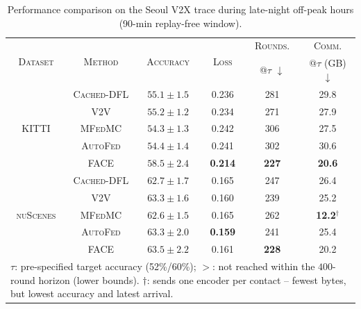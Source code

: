 \begin{table}[t]
    \centering
\caption{Performance comparison on the Seoul V2X trace during late-night off-peak hours (90-min replay-free window).}
    \label{tab:seoul_night}
    \footnotesize
    \renewcommand{\arraystretch}{1.0}
    \setlength{\tabcolsep}{3pt}
    \begin{tabular}{c|c|c|c|c|c}
        \toprule
        \multirow{2}{*}{\textsc{Dataset}}
        & \multirow{2}{*}{\textsc{Method}}
        & \multirow{2}{*}{\textsc{Accuracy}}
        & \multirow{2}{*}{\textsc{Loss}}
        & \textsc{Rounds.}
        & \textsc{Comm.} \\

        &
        &
        &
        & @$\tau$ $\downarrow$
        & @$\tau$ (GB) $\downarrow$ \\
        \midrule

        \multirow{5}{*}{\textsc{KITTI}}
        & \textsc{Cached-DFL}
        & $55.1 \pm 1.5$
        & 0.236
        & 281
        & 29.8 \\

        & \textsc{V2V}
        & $55.2 \pm 1.2$
        & 0.234
        & 271
        & 27.9 \\[1pt]

        & \textsc{MFedMC}
        & $54.3 \pm 1.3$
        & 0.242
        & 306
        & 27.5 \\

        & \textsc{AutoFed}
        & $54.4 \pm 1.4$
        & 0.241
        & 302
        & 30.6 \\[1pt]

        & \textsc{FACE}
        & $\mathbf{58.5 \pm 2.4}$
        & \textbf{0.214}
        & \textbf{227}
        & \textbf{20.6} \\

        \midrule

        \multirow{5}{*}{\textsc{nuScenes}}
        & \textsc{Cached-DFL}
        & $62.7 \pm 1.7$
        & 0.165
        & 247
        & 26.4 \\

        & \textsc{V2V}
        & $63.3 \pm 1.6$
        & 0.160
        & 239
        & 25.2 \\[1pt]

        & \textsc{MFedMC}
        & $62.6 \pm 1.5$
        & 0.165
        & 262
        & \textbf{12.2}$^{\dagger}$ \\

        & \textsc{AutoFed}
        & $63.3 \pm 2.0$
        & \textbf{0.159}
        & 241
        & 25.4 \\[1pt]

        & \textsc{FACE}
        & $\mathbf{63.5 \pm 2.2}$
        & 0.161
        & \textbf{228}
        & 20.2 \\

        \bottomrule
        \multicolumn{6}{l}{
            \scriptsize $\tau$: pre-specified target accuracy (52\%/60\%); $>$: not reached within the $400$-round horizon (lower bounds). $\dagger$: sends one encoder per contact -- fewest bytes, but lowest accuracy and latest arrival.
        }
    \end{tabular}
\end{table}
